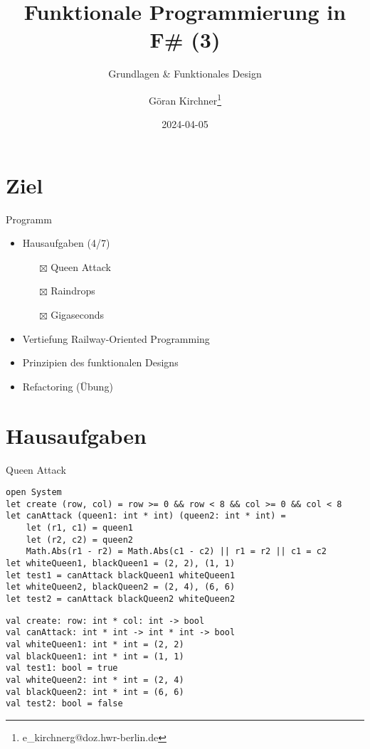 \documentclass[t]{beamer}
\author{Göran Kirchner\thanks{e\_kirchnerg@doz.hwr-berlin.de}}
\date{2024-04-05}
\title{Funktionale Programmierung in F\# (3)}
\subtitle{Grundlagen \& Funktionales Design}
\begin{document}
\maketitle

\section{Ziel }
\label{sec:orgd6fcdf4}

\begin{frame}[label={sec:org1d1ce03}]{Programm}
\begin{itemize}
\item Hausaufgaben (4/7)
\begin{itemize}
\item[{$\boxtimes$}] Queen Attack
\item[{$\boxtimes$}] Raindrops
\item[{$\boxtimes$}] Gigaseconds
\end{itemize}
\item Vertiefung Railway-Oriented Programming
\item Prinzipien des funktionalen Designs
\item Refactoring (Übung)
\end{itemize}
\end{frame}

\section{Hausaufgaben }
\label{sec:org36b33fb}
\begin{frame}[label={sec:orgedf0f57},fragile]{Queen Attack}
 \begin{verbatim}
open System
let create (row, col) = row >= 0 && row < 8 && col >= 0 && col < 8
let canAttack (queen1: int * int) (queen2: int * int) = 
    let (r1, c1) = queen1
    let (r2, c2) = queen2
    Math.Abs(r1 - r2) = Math.Abs(c1 - c2) || r1 = r2 || c1 = c2
let whiteQueen1, blackQueen1 = (2, 2), (1, 1)
let test1 = canAttack blackQueen1 whiteQueen1
let whiteQueen2, blackQueen2 = (2, 4), (6, 6)
let test2 = canAttack blackQueen2 whiteQueen2
\end{verbatim}

\begin{verbatim}
val create: row: int * col: int -> bool
val canAttack: int * int -> int * int -> bool
val whiteQueen1: int * int = (2, 2)
val blackQueen1: int * int = (1, 1)
val test1: bool = true
val whiteQueen2: int * int = (2, 4)
val blackQueen2: int * int = (6, 6)
val test2: bool = false
\end{verbatim}
\end{frame}
\end{document}
